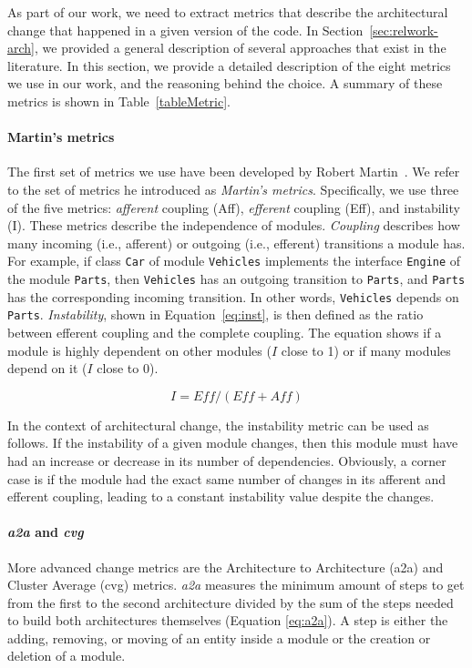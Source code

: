 \documentclass[sigplan, anonymous, review]{acmart}
\begin{document}
As part of our work, we need to extract metrics that describe the architectural change that happened in a given version of the code. 
In Section~\ref{sec:relwork-arch}, we provided a general description of several approaches that exist in the literature.
In this section, we provide a detailed description of the eight metrics we use in our work, and the reasoning behind the choice.
A summary of these metrics is shown in Table~\ref{tableMetric}.


\paragraph{Martin's metrics} 
The first set of metrics we use have been developed by Robert Martin~\cite{martinsMetrics}.
We refer to the set of metrics he introduced as \textit{Martin's metrics}.
Specifically, we use three of the five metrics: \textit{afferent} coupling (Aff), \textit{efferent} coupling (Eff), and instability (I).
These metrics describe the independence of modules. 
\textit{Coupling} describes how many incoming (i.e., afferent) or outgoing (i.e., efferent) transitions a module has. 
For example, if class \texttt{Car} of module \texttt{Vehicles} implements the interface \texttt{Engine} of the module \texttt{Parts}, then \texttt{Vehicles} has an outgoing transition to \texttt{Parts}, and \texttt{Parts} has the corresponding incoming transition. 
In other words, \texttt{Vehicles} depends on \texttt{Parts}.
\textit{Instability}, shown in Equation~\ref{eq:inst}, is then defined as the ratio between efferent coupling and the complete coupling.
The equation shows if a module is highly dependent on other modules ($I$ close to 1) or if many modules depend on it ($I$ close to 0).

\begin{equation} \label{eq:inst}
I = \textit{Eff} / (\textit{Eff} + \textit{Aff})
\end{equation}

In the context of architectural change, the instability metric can be used as follows. If the instability of a given module changes, then this module must have had an increase or decrease in its number of dependencies. 
Obviously, a corner case is if the module had the exact same number of changes in its afferent and efferent coupling, leading to a constant instability value despite the changes.

\paragraph{\textit{a2a} and \textit{cvg}} More advanced change metrics are the Architecture to Architecture (a2a) and Cluster Average (cvg) metrics. 
\textit{a2a} measures the minimum amount of steps to get from the first to the second architecture divided by the sum of the steps needed to build both architectures themselves (Equation \ref{eq:a2a}). A step is either the adding, removing, or moving of an entity inside a module or the creation or deletion of a module. 
\end{document}
